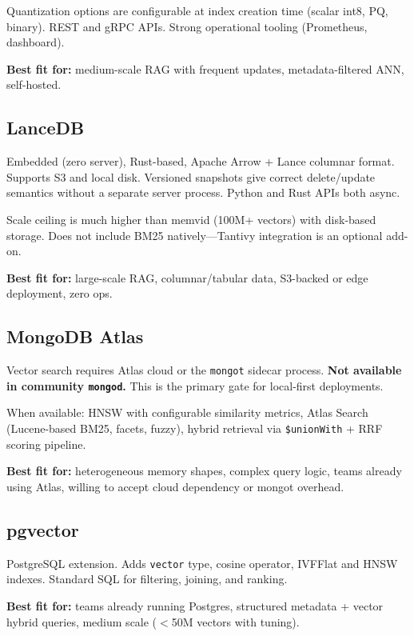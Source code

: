 Quantization options are configurable at index creation time (scalar int8, PQ, binary).
REST and gRPC APIs. Strong operational tooling (Prometheus, dashboard).

\textbf{Best fit for:} medium-scale RAG with frequent updates, metadata-filtered ANN,
self-hosted.

\subsection{LanceDB}

Embedded (zero server), Rust-based, Apache Arrow + Lance columnar format. Supports S3 and
local disk. Versioned snapshots give correct delete/update semantics without a separate server
process. Python and Rust APIs both async.

Scale ceiling is much higher than memvid (100M+ vectors) with disk-based storage. Does not
include BM25 natively---Tantivy integration is an optional add-on.

\textbf{Best fit for:} large-scale RAG, columnar/tabular data, S3-backed or edge deployment,
zero ops.

\subsection{MongoDB Atlas}

Vector search requires Atlas cloud or the \texttt{mongot} sidecar process. \textbf{Not
available in community \texttt{mongod}.} This is the primary gate for local-first deployments.

When available: HNSW with configurable similarity metrics, Atlas Search (Lucene-based BM25,
facets, fuzzy), hybrid retrieval via \texttt{\$unionWith} + RRF scoring pipeline.

\textbf{Best fit for:} heterogeneous memory shapes, complex query logic, teams already using
Atlas, willing to accept cloud dependency or mongot overhead.

\subsection{pgvector}

PostgreSQL extension. Adds \texttt{vector} type, cosine operator, IVFFlat and HNSW indexes.
Standard SQL for filtering, joining, and ranking.

\textbf{Best fit for:} teams already running Postgres, structured metadata + vector hybrid
queries, medium scale ($<$50M vectors with tuning).

